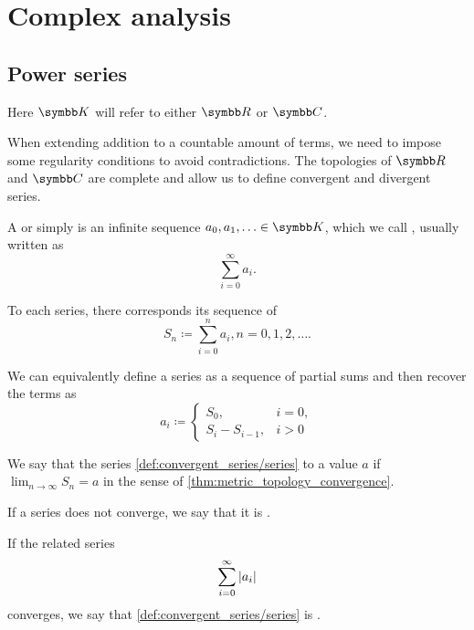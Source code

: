 \section{Complex analysis}\label{subsec:complex_analysis}
\subsection{Power series}\label{subsec:power_series}

Here \( \K \) will refer to either \( \R \) or \( \C \).

\begin{definition}\label{def:convergent_series}
  When extending addition to a countable amount of terms, we need to impose some regularity conditions to avoid contradictions. The topologies of \( \R \) and \( \C \) are complete and allow us to define convergent and divergent series.

  A  or simply  is an infinite sequence \( a_0, a_1, \ldots \in \K \), which we call , usually written as
  \begin{equation}\label{def:convergent_series/series}
    \sum_{i=0}^\infty a_i.
  \end{equation}

  To each series, there corresponds its sequence of 
  \begin{equation*}
    S_n \coloneqq \sum_{i=0}^n a_i, n = 0, 1, 2, \ldots.
  \end{equation*}

  We can equivalently define a series as a sequence of partial sums and then recover the terms as
  \begin{equation*}
    a_i \coloneqq \begin{cases}
      S_0,           &i = 0, \\
      S_i - S_{i-1}, &i > 0
    \end{cases}
  \end{equation*}

  We say that the series \cref{def:convergent_series/series}  to a value \( a \) if \( \lim_{n \to \infty} S_n = a \) in the sense of \cref{thm:metric_topology_convergence}.

  If a series does not converge, we say that it is .

  If the related series
  \begin{equation}\label{def:convergent_series/absolute_series}
    \sum_{i=0}^\infty \left\vert a_i \right\vert
  \end{equation}
  converges, we say that \cref{def:convergent_series/series} is .
\end{definition}

